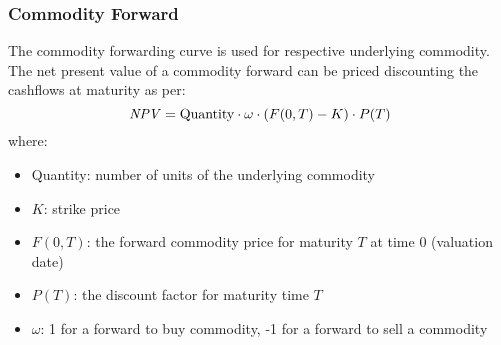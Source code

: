 \subsubsection{Commodity Forward}
\label{pricing:com_forward}

The commodity forwarding curve is used for respective underlying commodity. 
The net present value of a commodity forward can be priced discounting the 
cashflows at maturity as per:
$$
\mathit{NPV} = \mbox{Quantity}\cdot \omega\cdot (F(0,T) - K) \cdot P(T)
$$
where:
\begin{itemize}
\item Quantity: number of units of the underlying commodity
\item $K$: strike price
\item $F(0,T)$: the forward commodity price for maturity $T$ at time 0 (valuation date)
\item $P(T)$: the discount factor for maturity time $T$
\item $\omega$: 1 for a forward to buy commodity, -1 for a forward to sell a commodity 
\end{itemize}
